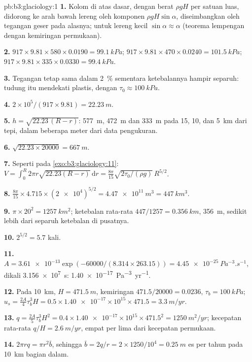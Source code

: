 \begin{solution}{pb:b3:glaciology:1}
\textbf{1.} Kolom di atas dasar, dengan berat $\rho gH$ per satuan luas, didorong
ke arah bawah lereng oleh komponen $\rho gH\sin\alpha$, diseimbangkan oleh
tegangan geser pada alasnya; untuk lereng kecil $\sin\alpha \approx \alpha$ (teorema
lempengan dengan kemiringan permukaan).

\textbf{2.} $917\times9.81\times580\times0.0190 = \qty{99.1}{kPa}$;
$917\times9.81\times470\times0.0240 = \qty{101.5}{kPa}$; $917\times9.81
\times335\times0.0330 = \qty{99.4}{kPa}$.

\textbf{3.} Tegangan tetap sama dalam \qty{2}{\percent} sementara
ketebalannya hampir separuh: tudung itu mendekati plastis, dengan $\tau_0 \approx
\qty{100}{kPa}$.

\textbf{4.} $2\times10^5/(917\times9.81) = \qty{22.23}{m}$.

\textbf{5.} $h = \sqrt{22.23\,(R - r)}$: \qty{577}{m}, \qty{472}{m} dan
\qty{333}{m} pada 15, 10, dan \qty{5}{km} dari tepi, dalam beberapa meter
dari data pengukuran.

\textbf{6.} $\sqrt{22.23\times20000} = \qty{667}{m}$.

\textbf{7.} Seperti pada \cref{exo:b3:glaciology:11}: $V = \int_0^R2\pi r
\sqrt{22.23(R - r)}\,\mathrm dr = \frac{8\pi}{15}\sqrt{2\tau_0/(\rho
g)}\,R^{5/2}$.

\textbf{8.} $\frac{8\pi}{15}\times4.715\times(\num{2e4})^{5/2} =
\qty{4.47e11}{m^3} = \qty{447}{km^3}$.

\textbf{9.} $\pi\times20^2 = \qty{1257}{km^2}$; ketebalan rata-rata
$447/1257 = \qty{0.356}{km}$, \qty{356}{m}, sedikit lebih dari separuh
ketebalan di pusatnya.

\textbf{10.} $2^{5/2} = 5.7$ kali.

\textbf{11.} $A = \num{3.61e-13}\exp(-60000/(8.314\times263.15)) =
\qty{4.45e-25}{Pa^{-3}.s^{-1}}$, dikali \qty{3.156e7}{s}:
\qty{1.40e-17}{Pa^{-3}.yr^{-1}}.

\textbf{12.} Pada \qty{10}{km}, $H = \qty{471.5}{m}$, kemiringan $471.5/20000 =
\num{0.0236}$, $\tau_b = \qty{100}{kPa}$; $u_s = \tfrac{2A}{4}\tau_b^3H =
0.5\times\num{1.40e-17}\times10^{15}\times471.5 = \qty{3.3}{m/yr}$.

\textbf{13.} $q = \tfrac{2A}{5}\tau_b^3H^2 = 0.4\times\num{1.40e-17}
\times10^{15}\times471.5^2 = \qty{1250}{m^2/yr}$; kecepatan rata-rata $q/H =
\qty{2.6}{m/yr}$, empat per lima dari kecepatan permukaan.

\textbf{14.} $2\pi rq = \pi r^2\bar b$, sehingga $\bar b = 2q/r = 2\times1250/10^4
= \qty{0.25}{m}$ es per tahun pada \qty{10}{km} bagian dalam.


\end{solution}
